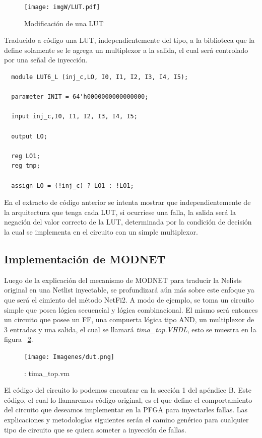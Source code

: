 \documentclass[a4paper,openright,12pt]{report}
\begin{document}
\begin{figure}[H]
	\centering
	\texttt{[image: imgW/LUT.pdf]}
	\caption{Modificación de una LUT}
	\label{LUT}
\end{figure}


Traducido a código una LUT, independientemente del tipo, a la biblioteca que la define solamente se le agrega  un multiplexor a la salida, el cual será controlado por una señal de inyección. 
\begin{lstlisting}
  module LUT6_L (inj_c,LO, I0, I1, I2, I3, I4, I5);

  parameter INIT = 64'h0000000000000000;

  input inj_c,I0, I1, I2, I3, I4, I5;

  output LO;

  reg LO1;
  reg tmp;
  
  assign LO = (!inj_c) ? LO1 : !LO1;
\end{lstlisting}

En el extracto de código anterior se intenta mostrar que independientemente de la arquitectura que tenga cada LUT, si ocurriese una falla, la salida será la negación del valor correcto de la LUT, determinada por la condición de decisión la cual se implementa en el circuito con un simple  multiplexor.


\subsection{  Implementación de MODNET}

Luego de la explicación del mecanismo de MODNET para traducir la Nelists original  en una Netlist inyectable, se   profundizará aún más sobre este enfoque ya que será el cimiento del método NetFi2. 
A modo de ejemplo, se toma un circuito simple que posea lógica secuencial y lógica combinacional. El mismo será  entonces un circuito que posee un FF, una compuerta lógica tipo AND, un multiplexor de 3 entradas y una salida, el cual se llamará \textit{tima\_top.VHDL}, esto se muestra en la figura ~\ref{TIMA}.


  \begin{figure}[H]
\centering
\texttt{[image: Imagenes/dut.png]}
\caption{: tima\_top.vm \label{overflow}}
   \label{TIMA}
   \end{figure}
    
                
El código del circuito lo podemos encontrar en la sección 1 del apéndice B.
Este código, el cual lo llamaremos código original, es el que define el comportamiento del circuito que deseamos implementar en la PFGA para inyectarles fallas.
Las explicaciones y metodologías siguientes serán el camino genérico para cualquier tipo de circuito que se quiera someter a inyección de fallas.
\end{document}
